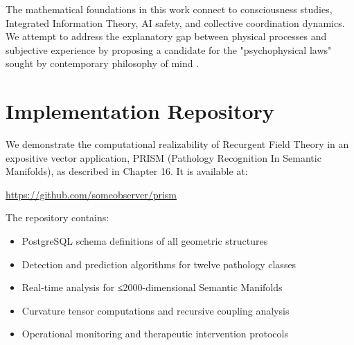 \documentclass[11pt, a4paper]{report}
\begin{document}
\vspace{1em}

The mathematical foundations in this work connect to consciousness studies, Integrated Information Theory, AI safety, and collective coordination dynamics. We attempt to address the explanatory gap between physical processes and subjective experience by proposing a candidate for the "psychophysical laws" sought by contemporary philosophy of mind \autocite{Chalmers1996}.

\tableofcontents


















\appendix
\chapter{Implementation Repository}
\label{appendix:implementation}

We demonstrate the computational realizability of Recurgent Field Theory in an expositive vector application, PRISM (Pathology Recognition In Semantic Manifolds), as described in Chapter 16. It is available at:

\begin{center}
\url{https://github.com/someobserver/prism}
\end{center}

The repository contains:
\begin{itemize}
\item PostgreSQL schema definitions of all geometric structures
\item Detection and prediction algorithms for twelve pathology classes
\item Real-time analysis for ≤2000-dimensional Semantic Manifolds
\item Curvature tensor computations and recursive coupling analysis
\item Operational monitoring and therapeutic intervention protocols
\end{itemize}
\end{document}
